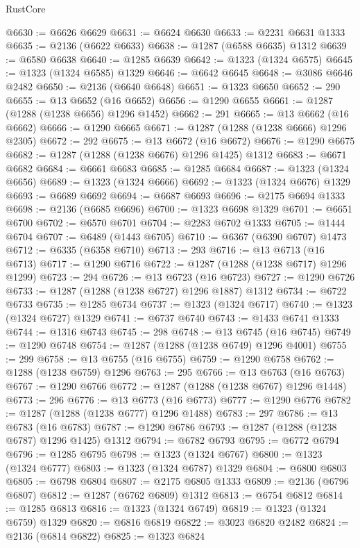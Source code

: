 \begin{lexlean}{RustCore}
\begin{coremodule}
@6630 := @6626 @6629
@6631 := @6624 @6630
@6633 := @2231 @6631 @1333
@6635 := @2136 (@6622 @6633)
@6638 := @1287 (@6588 @6635) @1312
@6639 := @6580 @6638
@6640 := @1285 @6639
@6642 := @1323 (@1324 @6575)
@6645 := @1323 (@1324 @6585) @1329
@6646 := @6642 @6645
@6648 := @3086 @6646 @2482
@6650 := @2136 (@6640 @6648)
@6651 := @1323 @6650
@6652 := 290
@6655 := @13 @6652 (@16 @6652)
@6656 := @1290 @6655
@6661 := @1287 (@1288 (@1238 @6656) @1296 @1452)
@6662 := 291
@6665 := @13 @6662 (@16 @6662)
@6666 := @1290 @6665
@6671 := @1287 (@1288 (@1238 @6666) @1296 @2305)
@6672 := 292
@6675 := @13 @6672 (@16 @6672)
@6676 := @1290 @6675
@6682 := @1287 (@1288 (@1238 @6676) @1296 @1425) @1312
@6683 := @6671 @6682
@6684 := @6661 @6683
@6685 := @1285 @6684
@6687 := @1323 (@1324 @6656)
@6689 := @1323 (@1324 @6666)
@6692 := @1323 (@1324 @6676) @1329
@6693 := @6689 @6692
@6694 := @6687 @6693
@6696 := @2175 @6694 @1333
@6698 := @2136 (@6685 @6696)
@6700 := @1323 @6698 @1329
@6701 := @6651 @6700
@6702 := @6570 @6701
@6704 := @2283 @6702 @1333
@6705 := @1444 @6704
@6707 := @6489 (@1443 @6705)
@6710 := @6367 (@6390 @6707) @1473
@6712 := @6335 (@6358 @6710)
@6713 := 293
@6716 := @13 @6713 (@16 @6713)
@6717 := @1290 @6716
@6722 := @1287 (@1288 (@1238 @6717) @1296 @1299)
@6723 := 294
@6726 := @13 @6723 (@16 @6723)
@6727 := @1290 @6726
@6733 := @1287 (@1288 (@1238 @6727) @1296 @1887) @1312
@6734 := @6722 @6733
@6735 := @1285 @6734
@6737 := @1323 (@1324 @6717)
@6740 := @1323 (@1324 @6727) @1329
@6741 := @6737 @6740
@6743 := @1433 @6741 @1333
@6744 := @1316 @6743
@6745 := 298
@6748 := @13 @6745 (@16 @6745)
@6749 := @1290 @6748
@6754 := @1287 (@1288 (@1238 @6749) @1296 @4001)
@6755 := 299
@6758 := @13 @6755 (@16 @6755)
@6759 := @1290 @6758
@6762 := @1288 (@1238 @6759) @1296
@6763 := 295
@6766 := @13 @6763 (@16 @6763)
@6767 := @1290 @6766
@6772 := @1287 (@1288 (@1238 @6767) @1296 @1448)
@6773 := 296
@6776 := @13 @6773 (@16 @6773)
@6777 := @1290 @6776
@6782 := @1287 (@1288 (@1238 @6777) @1296 @1488)
@6783 := 297
@6786 := @13 @6783 (@16 @6783)
@6787 := @1290 @6786
@6793 := @1287 (@1288 (@1238 @6787) @1296 @1425) @1312
@6794 := @6782 @6793
@6795 := @6772 @6794
@6796 := @1285 @6795
@6798 := @1323 (@1324 @6767)
@6800 := @1323 (@1324 @6777)
@6803 := @1323 (@1324 @6787) @1329
@6804 := @6800 @6803
@6805 := @6798 @6804
@6807 := @2175 @6805 @1333
@6809 := @2136 (@6796 @6807)
@6812 := @1287 (@6762 @6809) @1312
@6813 := @6754 @6812
@6814 := @1285 @6813
@6816 := @1323 (@1324 @6749)
@6819 := @1323 (@1324 @6759) @1329
@6820 := @6816 @6819
@6822 := @3023 @6820 @2482
@6824 := @2136 (@6814 @6822)
@6825 := @1323 @6824

\end{coremodule}
\end{lexlean}
